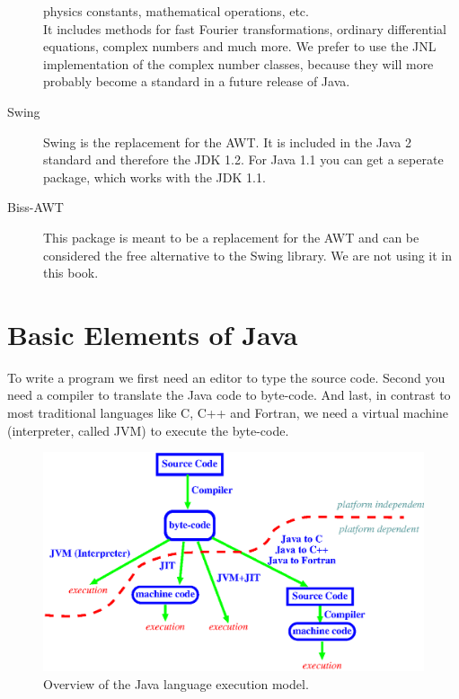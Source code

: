\begin{description}
  physics constants, mathematical operations, etc. \\
  It includes methods for fast Fourier transformations, ordinary differential 
  equations, complex numbers and much more. We prefer to use the JNL
  implementation of the complex number classes, because they will
  more probably become a standard in a future release of Java.
\item[Swing]  
  Swing is the replacement for the AWT. It is included in the
  Java 2 standard and therefore the JDK 1.2. For Java 1.1 you can get
  a seperate package, which works with the JDK 1.1. 
\item[Biss-AWT]  
  This package is meant to be a replacement for the AWT and
  can be considered the free alternative to the Swing library. We are not 
  using it in this book.
\end{description}



\section{Basic Elements of Java}
\label{sec:Basic_elements_of_Java}
To write a program we first need an editor
to type the source code. Second you need a compiler to translate
the Java code to byte-code. And last, in contrast to most
traditional languages like C, C++ and Fortran, we need a virtual
machine (interpreter, called JVM) to execute the byte-code.

\begin{figure}[htbp]
  \begin{center}
    \leavevmode
    \includegraphics[width=\textwidth]{Figures/Java_Overview.eps}
    \caption{Overview of the Java language execution model.}
    \label{fig:Java_Overview}
  \end{center}
\end{figure}

